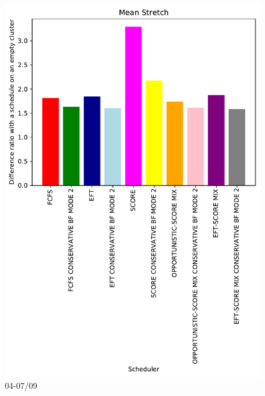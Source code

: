 \documentclass[a4paper]{article}
\begin{document}
\begin{figure}\includegraphics[width=0.9\linewidth]{MBSS/plot/Results_FCFS_Score_Backfill_2022-04-07->2022-04-09_V10000_Mean_Stretch_450_128_32_256_4_1024.pdf}\caption{04-07/09}\end{figure}
\end{document}
